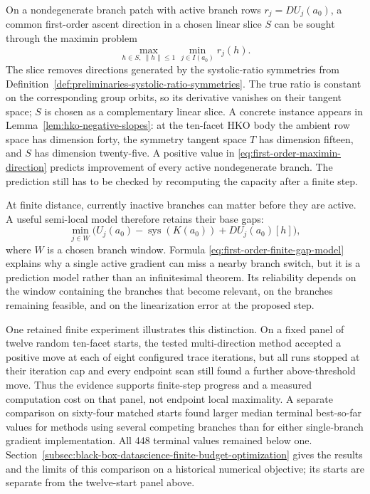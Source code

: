 On a nondegenerate branch patch with active branch rows
\(r_j=DU_j(a_0)\), a common first-order ascent direction in a chosen linear
slice \(S\) can be sought through the maximin problem
\begin{equation}\label{eq:first-order-maximin-direction}
  \max_{h\in S,\ \lVert h\rVert\leq1}
  \min_{j\in I(a_0)} r_j(h).
\end{equation}
The slice removes directions generated by the systolic-ratio symmetries from
Definition~\ref{def:preliminaries-systolic-ratio-symmetries}.  The true ratio
is constant on the corresponding group orbits, so its derivative vanishes on
their tangent space; \(S\) is chosen as a complementary linear slice.  A
concrete instance appears in Lemma~\ref{lem:hko-negative-slopes}: at the
ten-facet HKO body the ambient row space has dimension forty, the symmetry
tangent space $T$ has dimension fifteen, and $S$ has dimension twenty-five.
A positive value in
\eqref{eq:first-order-maximin-direction} predicts improvement of every active
nondegenerate branch.  The prediction still has to be checked by recomputing the
capacity after a finite step.

At finite distance, currently inactive branches can matter before they are
active.  A useful semi-local model therefore retains their base gaps:
\begin{equation}\label{eq:first-order-finite-gap-model}
  \min_{j\in W}
  \bigl(
    U_j(a_0)-\operatorname{sys}(K(a_0))+DU_j(a_0)[h]
  \bigr),
\end{equation}
where \(W\) is a chosen branch window.  Formula
\eqref{eq:first-order-finite-gap-model} explains why a single active gradient
can miss a nearby branch switch, but it is a prediction model rather than an
infinitesimal theorem.  Its reliability depends on the window containing the
branches that become relevant, on the branches remaining feasible, and on the
linearization error at the proposed step.

One retained finite experiment illustrates this distinction.  On a fixed
panel of twelve random ten-facet starts, the tested multi-direction
method accepted a positive move at each of eight configured trace iterations,
but all runs stopped at their iteration cap and every endpoint scan still
found a further above-threshold move.  Thus the evidence supports finite-step
progress and a measured computation cost on that panel, not endpoint local
maximality.  A separate comparison on sixty-four matched starts found larger median
terminal best-so-far values for methods using several competing branches
than for either single-branch gradient implementation. All 448 terminal
values remained below one. Section~\ref{subsec:black-box-datascience-finite-budget-optimization}
gives the results and the limits of this comparison on a historical numerical
objective; its starts are separate from the twelve-start panel above.

